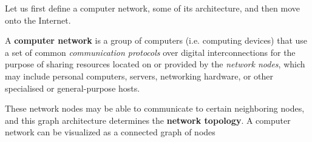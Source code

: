 \documentclass{article}
\begin{document}
    Let us first define a computer network, some of its architecture, and then move onto the Internet. 

    \begin{definition}
      A \textbf{computer network} is a group of computers (i.e. computing devices) that use a set of common \textit{communication protocols} over digital interconnections for the purpose of sharing resources located on or provided by the \textit{network nodes}, which may include personal computers, servers, networking hardware, or other specialised or general-purpose hosts. 

    \end{definition}

    These network nodes may be able to communicate to certain neighboring nodes, and this graph architecture determines the \textbf{network topology}. A computer network can be visualized as a connected graph of nodes 
\end{document}
